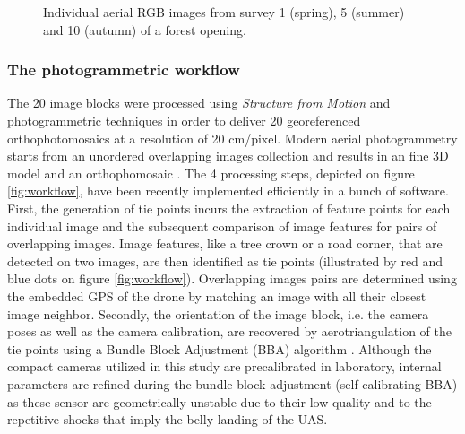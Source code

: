 \documentclass[remotesensing,article,submit,moreauthors,pdftex,12pt,a4paper]{mdpi} %
\begin{document}
\begin{figure}
\captionsetup[subfigure]{labelformat=empty}
\centering
{}\hspace{0.01mm}
\hspace{0.01mm}
\hspace{0.01mm}
\caption{Individual aerial RGB images from survey 1 (spring), 5 (summer) and 10 (autumn) of a forest opening.}
\label{fig:TS_RawIm}
\end{figure}

\subsubsection{The photogrammetric workflow}

The 20 image blocks were processed using \textit{Structure from Motion} and photogrammetric techniques in order to deliver 20 georeferenced orthophotomosaics at a resolution of 20 cm/pixel. 
Modern aerial photogrammetry starts from an unordered overlapping images collection and results in an fine 3D model and an orthophomosaic \citep{dandois_high_2013}. 
The 4 processing steps, depicted on figure \ref{fig:workflow}, have been recently implemented efficiently in a bunch of software. 
First, the generation of tie points incurs the extraction of feature points for each individual image and the subsequent comparison of image features for pairs of overlapping images. 
Image features, like a tree crown or a road corner, that are detected on two images, are then identified as tie points (illustrated by red and blue dots on figure \ref{fig:workflow}). 
Overlapping images pairs are determined using the embedded GPS of the drone by matching an image with all their closest image neighbor. 
Secondly, the orientation of the image block, i.e. the camera poses as well as the camera calibration, are recovered by aerotriangulation of the tie points using a Bundle Block Adjustment (BBA) algorithm \cite{triggs_bundle_2000}. 
Although the compact cameras utilized in this study are precalibrated in laboratory, internal parameters are refined during the bundle block adjustment (self-calibrating BBA) as these sensor are geometrically unstable due to their low quality \cite{labe_geometric_2004} and to the repetitive shocks that imply the belly landing of the UAS.
\end{document}
